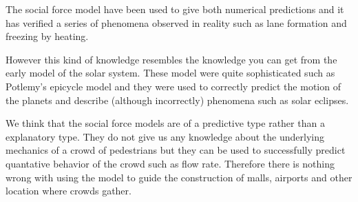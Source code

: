 The social force model have been used to give both numerical predictions 
and it has verified a series of phenomena observed in reality such as 
lane formation and freezing by heating.

However this kind of knowledge resembles the knowledge you can get from 
the early model of the solar system. These model were quite sophisticated 
such as Potlemy's epicycle model and they were used to correctly predict the 
motion of the planets and describe (although incorrectly) phenomena such as 
solar eclipses.

We think that the social force models are of a predictive type rather than 
a explanatory type. They do not give us any knowledge about the underlying 
mechanics of a crowd of pedestrians but they can be used to successfully 
predict quantative behavior of the crowd such as flow rate. Therefore there 
is nothing wrong with using the model to guide the construction of malls, airports 
and other location where crowds gather.
